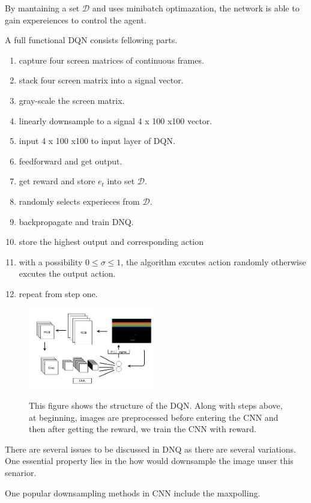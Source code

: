 \documentclass{article}
\begin{document}
By mantaining a set $\mathcal{D}$ and uses minibatch optimazation, the network is able to gain expereiences to control the agent.

A full functional DQN consists fellowing parts.

\begin{enumerate}
\item capture four screen matrices of continuous frames.
\item stack four screen matrix into a signal vector.
\item gray-scale the screen matrix.
\item linearly downsample to a signal 4 x 100 x100 vector.
\item input 4 x 100 x100 to input layer of DQN.
\item feedforward and get output.
\item get reward and store $e_t$ into set $\mathcal{D}$.
\item randomly selects experieces from  $\mathcal{D}$.
\item backpropagate and train DNQ.
\item store the highest output and corresponding action
\item with a possibility $0 \leq \sigma \leq 1$, the algorithm excutes action randomly otherwise excutes the output action.
\item repeat from step one.
\end{enumerate}
\begin{figure}[H]
\centering
{\includegraphics[width = 0.5\textwidth]{dqn}} 
\caption{This figure shows the structure of the DQN. Along with steps above, at beginning, images are preprocessed before entering the CNN and then after getting the reward,  we train the CNN with reward.}\label{dqn}
\end{figure}

There are several issues to be discussed in DNQ as there are several variations. One essential property lies in the how would downsample the image unser this senarior. 

One popular downsampling methods in CNN include the maxpolling.
\end{document}
